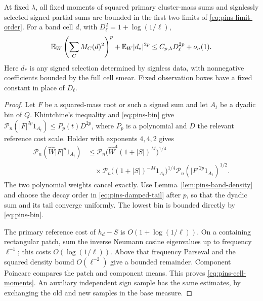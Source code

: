 \begin{lemma}\label{lem:pins-weighted}
At fixed \(\lambda\), all fixed moments of squared primary
cluster-mass sums and signlessly selected signed partial sums
are bounded in the first two limits of
\eqref{eq:pins-limit-order}. For a band cell \(d\), with
\(D_\ell^2=1+\log(1/\ell)\),
\begin{equation}
 \mathbb E_W\left(\sum_CM_C(d)^2\right)^p
       +\mathbb E_W|d_*|^{2p}
       \le C_{p,\lambda}D_\ell^{2p}+o_n(1).
 \label{eq:pins-cell-moments}
\end{equation}
Here \(d_*\) is any signed selection determined by signless data,
with nonnegative coefficients bounded by the full cell smear.
Fixed observation boxes have a fixed constant in place of
\(D_\ell\).
\end{lemma}

\begin{proof}
Let \(F\) be a squared-mass root or such a signed sum and let
\(A_t\) be a dyadic bin of \(Q\). Khintchine's inequality and
\eqref{eq:pins-bin} give
\(\mathcal P_n(|F|^{2p}1_{A_t})\le P_p(t)D^{2p}\),
where \(P_p\) is a polynomial and \(D\) the relevant reference
cost scale. Holder with exponents \(4,4,2\) gives
\begin{align*}
 \mathcal P_n(\widehat W|F|^p1_{A_t})
 &\le
 \mathcal P_n\bigl(\widehat W^4(1+|S|)^M\bigr)^{1/4}\\
 &\quad{}\times
 \mathcal P_n\bigl((1+|S|)^{-M}1_{A_t}\bigr)^{1/4}
 \mathcal P_n(|F|^{2p}1_{A_t})^{1/2}.
\end{align*}
The two polynomial weights cancel exactly. Use
Lemma~\ref{lem:pins-band-density} and choose the decay order in
\eqref{eq:pins-damped-tail} after \(p\), so that the dyadic sum
and its tail converge uniformly. The lowest bin is bounded
directly by \eqref{eq:pins-bin}.

The primary reference cost of \(h_d-S\) is
\(O(1+\log(1/\ell))\). On a containing rectangular patch,
sum the inverse Neumann cosine eigenvalues up to frequency
\(\ell^{-1}\); this costs \(O(\log(1/\ell))\).
Above that frequency Parseval and the squared density bound
\(O(\ell^{-2})\) give a bounded remainder. Component Poincare
compares the patch and component means. This proves
\eqref{eq:pins-cell-moments}. An auxiliary independent sign
sample has the same estimates, by exchanging the old and new
samples in the base measure.
\end{proof}

